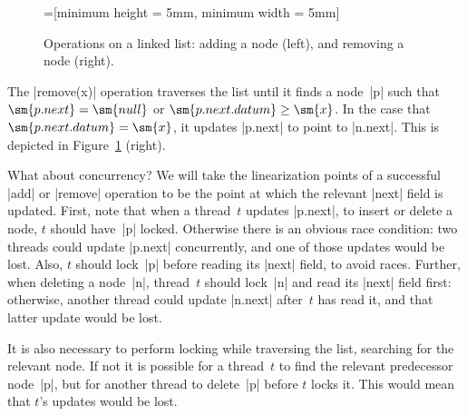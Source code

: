 \begin{figure}
\def\new{red} %
=[minimum height = 5mm, minimum width = 5mm]
\begin{center}
%
\hfil
%
\end{center}
\caption{Operations on a linked list: adding a node (left), and removing a node
  (right).}
\label{fig:linkedlist-ops}
\end{figure}


The |remove(x)| operation traverses the list until it finds a node~|p| such that
$\sm{p.next} = \sm{null}$ or $\sm{p.next.datum} \ge \sm{x}$.  In the case that
$\sm{p.next.datum} = \sm{x}$, it updates |p.next| to point to |n.next|.  This
is depicted in Figure~\ref{fig:linkedlist-ops} (right).

What about concurrency?  We will take the linearization points of a successful
|add| or |remove| operation to be the point at which the relevant |next| field
is updated.  First, note that when a thread~$t$ updates |p.next|, to insert or
delete a node, $t$ should have~|p| locked.  Otherwise there is an obvious race
condition: two threads could update |p.next| concurrently, and one of those
updates would be lost.  Also, $t$ should lock~|p| before reading its |next|
field, to avoid races.  Further, when deleting a node~|n|, thread~$t$ should
lock~|n| and read its |next| field first: otherwise, another thread could
update |n.next| after~$t$ has read it, and that latter update would be lost.

It is also necessary to perform locking while traversing the list, searching
for the relevant node.  If not it is possible for a thread~$t$ to find the
relevant predecessor node~|p|, but for another thread to delete~|p| before $t$
locks it.  This would mean that $t$'s updates would be lost.


